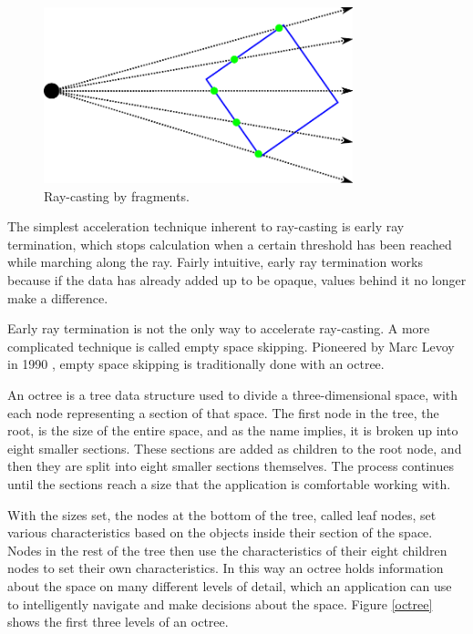 \documentclass{report}
\begin{document}
\begin{figure}
\centering
\includegraphics[width=0.8\textwidth]{fragment-ray-casting.pdf}
\caption{Ray-casting by fragments.}
\label{fragment-ray-casting}
\end{figure}

The simplest acceleration technique inherent to ray-casting is early ray
termination, which stops calculation when a certain threshold has been reached
while marching along the ray.  Fairly intuitive, early ray termination works
because if the data has already added up to be opaque, values behind it no
longer make a difference.

Early ray termination is not the only way to accelerate ray-casting. A more
complicated technique is called empty space skipping.  Pioneered by Marc Levoy
in 1990 \cite{Levoy90}, empty space skipping is traditionally done with an
octree.

An octree is a tree data structure used to divide a three-dimensional space,
with each node representing a section of that space.  The first node in the
tree, the root, is the size of the entire space, and as the name implies, it is
broken up into eight smaller sections.  These sections are added as children to
the root node, and then they are split into eight smaller sections themselves.
The process continues until the sections reach a size that the application is
comfortable working with.

With the sizes set, the nodes at the bottom of the tree, called leaf nodes, set
various characteristics based on the objects inside their section of the space.
Nodes in the rest of the tree then use the characteristics of their eight
children nodes to set their own characteristics.  In this way an octree holds
information about the space on many different levels of detail, which an
application can use to intelligently navigate and make decisions about the
space.  Figure \ref{octree} shows the first three levels of an octree.
\end{document}
